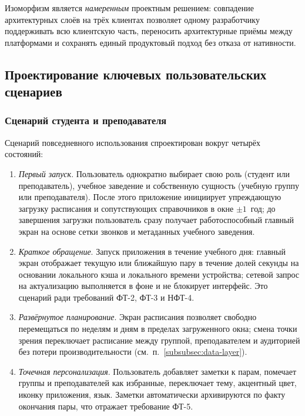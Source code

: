 Изоморфизм является \emph{намеренным} проектным решением: совпадение архитектурных слоёв на трёх клиентах позволяет одному разработчику поддерживать всю клиентскую часть, переносить архитектурные приёмы между платформами и сохранять единый продуктовый подход без отказа от нативности.

\subsection{Проектирование ключевых пользовательских сценариев}
\label{subsec:scenarios}

\subsubsection{Сценарий студента и преподавателя}
\label{subsubsec:student-scenario}

Сценарий повседневного использования спроектирован вокруг четырёх состояний:

\begin{enumerate}
  \item \emph{Первый запуск}. Пользователь однократно выбирает свою роль (студент или преподаватель), учебное заведение и собственную сущность (учебную группу или преподавателя). После этого приложение инициирует упреждающую загрузку расписания и сопутствующих справочников в окне $\pm 1$~год; до завершения загрузки пользователь сразу получает работоспособный главный экран на основе сетки звонков и метаданных учебного заведения.
  \item \emph{Краткое обращение}. Запуск приложения в течение учебного дня: главный экран отображает текущую или ближайшую пару в течение долей секунды на основании локального кэша и локального времени устройства; сетевой запрос на актуализацию выполняется в фоне и не блокирует интерфейс. Это сценарий ради требований ФТ-2, ФТ-3 и НФТ-4.
  \item \emph{Развёрнутое планирование}. Экран расписания позволяет свободно перемещаться по неделям и дням в пределах загруженного окна; смена точки зрения переключает расписание между группой, преподавателем и аудиторией без потери производительности (см.~п.~\ref{subsubsec:data-layer}).
  \item \emph{Точечная персонализация}. Пользователь добавляет заметки к парам, помечает группы и преподавателей как избранные, переключает тему, акцентный цвет, иконку приложения, язык. Заметки автоматически архивируются по факту окончания пары, что отражает требование ФТ-5.
\end{enumerate}

